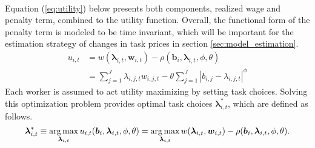 \documentclass[../main.tex]{subfiles}
\begin{document}
\\
Equation (\ref{eq:utility}) below presents both components, realized wage and penalty term, combined to the utility function. Overall, the functional form of the penalty term is modeled to be time invariant, which will be important for the estimation strategy of changes in task prices in section \ref{sec:model_estimation}.
\begin{align}\label{eq:utility}
	u_{i,t} &= w(\boldsymbol{\lambda}_{i,t}, \boldsymbol{w}_{i,t}) - \rho(\boldsymbol{b}_i, \boldsymbol{\lambda}_{i,t}, \phi, \theta)  \\
	{}		&= \sum^J_{j=1} \lambda_{i,j,t} w_{i,j,t} - \theta \sum^J_{j=1} |b_{i,j} - \lambda_{i,j,t}|^\phi \nonumber
\end{align}
Each worker is assumed to act utility maximizing by setting task choices. Solving this optimization problem provides optimal task choices $\boldsymbol{\lambda}^*_{i, t}$, which are defined as follows.
\begin{equation} \label{eq:optimization_problem}
	\boldsymbol{\lambda}^*_{i, t} \equiv \operatorname*{arg\,max}_{\boldsymbol{\lambda}_{i, t}} u_{i,t}(\boldsymbol{b}_i, \boldsymbol{\lambda}_{i, t}, \phi, \theta) = \operatorname*{arg\,max}_{\boldsymbol{\lambda}_{i, t}} w(\boldsymbol{\lambda}_{i,t}, \boldsymbol{w}_{i,t}) - \rho(\boldsymbol{b}_i, \boldsymbol{\lambda}_{i,t}, \phi, \theta).
\end{equation}
\end{document}

